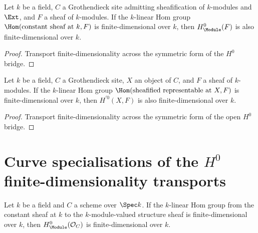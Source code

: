 \begin{theorem}
  \label{thm:Scheme_module_finite_HModule_zero}

  Let \(k\) be a field, \(C\) a Grothendieck site admitting sheafification of \(k\)-modules and \(\Ext\), and \(F\) a sheaf of \(k\)-modules. If the \(k\)-linear Hom group \(\Hom(\text{constant sheaf at }k, F)\) is finite-dimensional over \(k\), then \(H^0_{\Module}(F)\) is also finite-dimensional over \(k\).
\end{theorem}

\begin{proof}
  
  \leanok
  Transport finite-dimensionality across the symmetric form of the \(H^0\) bridge.
\end{proof}

\begin{theorem}
  \label{thm:Scheme_module_finite_HModule_prime_zero}
  Let \(k\) be a field, \(C\) a Grothendieck site, \(X\) an object of \(C\), and \(F\) a sheaf of \(k\)-modules. If the \(k\)-linear Hom group \(\Hom(\text{sheafified representable at }X, F)\) is finite-dimensional over \(k\), then \(H^{\prime 0}(X, F)\) is also finite-dimensional over \(k\).
\end{theorem}

\begin{proof}
  
  \leanok
  Transport finite-dimensionality across the symmetric form of the open \(H^0\) bridge.
\end{proof}

\section{Curve specialisations of the \(H^0\) finite-dimensionality transports}
\label{sec:HModule_finite_zero_curve_iter039}

\begin{theorem}
  \label{thm:Scheme_module_finite_HModule_zero_curve}
  Let \(k\) be a field and \(C\) a scheme over \(\Spec k\). If the \(k\)-linear Hom group from the constant sheaf at \(k\) to the \(k\)-module-valued structure sheaf is finite-dimensional over \(k\), then \(H^0_{\Module}(\mathcal O_C)\) is finite-dimensional over \(k\).
\end{theorem}

